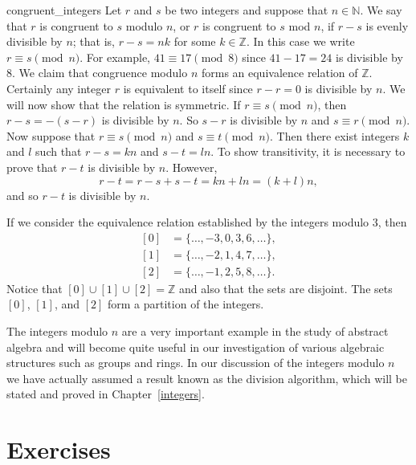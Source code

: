 \begin{example}{congruent_integers}
Let $r$ and $s$ be two integers and suppose that $n \in {\mathbb N}$.  We say that $r$ is {\bfi congruent to $s$ \bfi modulo} $n$, or $r$ is {\bfi congruent to $s$ \bfi mod} $n$, if $r - s$ is evenly divisible by $n$; that is, $r - s = nk$  for some $k \in {\mathbb Z}$.  In this case we write $r \equiv s \pmod{n}$\label{amodb}.  For example, $41 \equiv 17 \pmod{ 8}$ since $41 - 17=24$ is divisible by 8.  We claim that congruence modulo $n$ forms an equivalence relation of ${\mathbb Z}$.  Certainly any integer $r$ is equivalent to itself since $r - r = 0$ is divisible by $n$.  We will now show that the relation is symmetric.  If $r \equiv s \pmod{ n}$, then $r - s = -(s -r)$ is divisible by $n$. So $s - r$ is divisible by $n$ and $s \equiv r \pmod{ n}$.  Now suppose that $r \equiv s \pmod{ n}$ and $s \equiv t \pmod{ n}$.  Then there exist integers $k$ and $l$ such that $r -s = kn$ and $s - t = ln$.  To show transitivity, it is necessary to prove that $r - t$ is divisible by $n$.  However,   
\[
r - t = r - s + s - t = kn + ln = (k + l)n,
\]
and so $r - t$ is divisible by $n$.
 
 
If we consider the equivalence relation established by the integers modulo 3, then 
\begin{align*}
{[0]} & = \{ \ldots, -3, 0, 3, 6, \ldots \}, \\
{[1]} & = \{ \ldots, -2, 1, 4, 7, \ldots \}, \\
{[2]} & = \{ \ldots, -1, 2, 5, 8, \ldots \}.
\end{align*}
Notice that $[0] \cup [1] \cup [2] = {\mathbb Z}$ and also that the sets are disjoint.  The sets $[0]$, $[1]$, and $[2]$ form a partition of the integers. 

The integers modulo $n$ are a very important example in the study of abstract algebra and will become quite useful in our investigation of various algebraic structures such as groups and rings.  In our discussion of the integers modulo $n$ we have actually assumed a result known as the division algorithm, which will be stated and proved in Chapter~\ref{integers}.
\end{example}

 
\section*{Exercises}
\exrule
 
